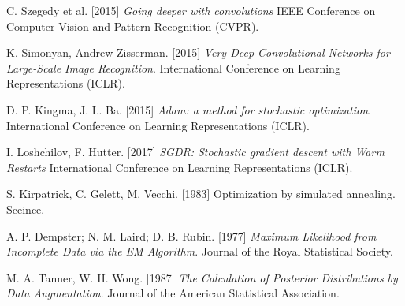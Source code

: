 \begin{thebibliography}{99}
	 C. Szegedy et al. [2015]
	 \textit{Going deeper with convolutions}
	 IEEE Conference on Computer Vision and Pattern Recognition (CVPR).
	 
	 K. Simonyan, Andrew Zisserman. [2015]
	 \textit{Very Deep Convolutional Networks for Large-Scale Image Recognition}.
	 International Conference on Learning Representations (ICLR).
	 
	 D. P. Kingma, J. L. Ba. [2015]
	 \textit{Adam: a method for stochastic optimization}.
	 International Conference on Learning Representations (ICLR).
	 
	 I. Loshchilov, F. Hutter. [2017]
	 \textit{SGDR: Stochastic gradient descent with Warm Restarts}
	 International Conference on Learning Representations (ICLR).
	 	 
	 S. Kirpatrick, C. Gelett, M. Vecchi. [1983]
	 Optimization by simulated annealing.
	 Sceince.
	 
	A. P. Dempster; N. M. Laird; D. B. Rubin. [1977]
	\textit{Maximum Likelihood from Incomplete Data via the EM Algorithm}.
	Journal of the Royal Statistical Society.
	 
	M. A. Tanner, W. H. Wong. [1987]
	\textit{The Calculation of Posterior Distributions by Data Augmentation}.
	Journal of the American Statistical Association.
	
\end{thebibliography}
